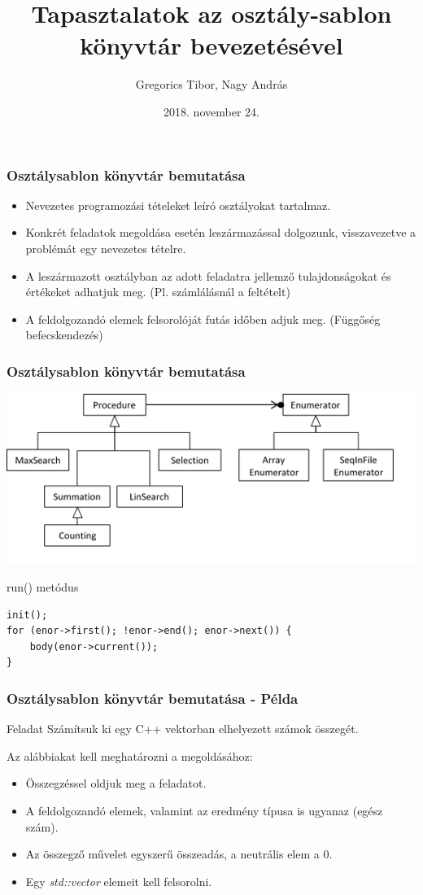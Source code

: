 \documentclass[11pt]{beamer}
\author{Gregorics Tibor, Nagy András}
\title{Tapasztalatok az osztály-sablon könyvtár bevezetésével}
\date{2018. november 24.}
\begin{document}
\begin{frame}
\titlepage
\end{frame}

\begin{frame}
	\frametitle{Osztálysablon könyvtár bemutatása}
	
	\begin{itemize}
		\item Nevezetes programozási tételeket leíró osztályokat tartalmaz.
		\item Konkrét feladatok megoldása esetén leszármazással dolgozunk, visszavezetve a problémát egy nevezetes tételre.
		\item A leszármazott osztályban az adott feladatra jellemző tulajdonságokat és értékeket adhatjuk meg. (Pl. számlálásnál a feltételt)
		\item A feldolgozandó elemek felsorolóját futás időben adjuk meg. (Függőség befecskendezés)
	\end{itemize}
\end{frame}

\begin{frame}[fragile]
	\frametitle{Osztálysablon könyvtár bemutatása}
	\includegraphics[scale=0.8]{sablon_hiearhica.png}
	
	\begin{block}{run() metódus}
		\begin{lstlisting}[basicstyle=\small]
init();
for (enor->first(); !enor->end(); enor->next()) {
    body(enor->current());
}
		\end{lstlisting}
	\end{block}
	
\end{frame}


\begin{frame}[fragile]
	\frametitle{Osztálysablon könyvtár bemutatása - Példa}	
	\begin{block}{Feladat}
		Számítsuk ki egy C++ vektorban elhelyezett számok összegét.
	\end{block}
	
	Az alábbiakat kell meghatározni a megoldásához:
	\begin{itemize}
		\item Összegzéssel oldjuk meg a feladatot.
		\item A feldolgozandó elemek, valamint az eredmény típusa is ugyanaz (egész szám).
		\item Az összegző művelet egyszerű összeadás, a neutrális elem a 0.
		\item Egy \textit{std::vector} elemeit kell felsorolni.
	\end{itemize}

	
\end{frame}
\end{document}
